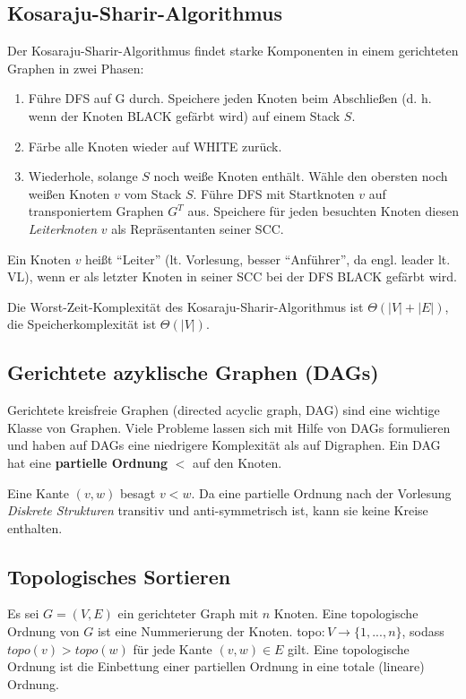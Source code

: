 \documentclass[12pt]{article}
\begin{document}
\subsection{Kosaraju-Sharir-Algorithmus}

Der Kosaraju-Sharir-Algorithmus findet starke Komponenten in einem gerichteten Graphen in zwei Phasen:

\begin{enumerate}
\item Führe DFS auf G durch. Speichere jeden Knoten beim Abschließen (d. h. wenn der Knoten BLACK gefärbt wird) auf einem Stack $S$.
\item Färbe alle Knoten wieder auf WHITE zurück.
\item Wiederhole, solange $S$ noch weiße Knoten enthält. Wähle den obersten noch weißen Knoten $v$ vom Stack $S$. Führe DFS mit Startknoten $v$ auf transponiertem Graphen $G^T$ aus. Speichere für jeden besuchten Knoten diesen \textit{Leiterknoten} $v$ als Repräsentanten seiner SCC.
\end{enumerate}

Ein Knoten $v$ heißt \enquote{Leiter} (lt. Vorlesung, besser \enquote{Anführer}, da engl. leader lt. VL), wenn er als letzter Knoten in seiner SCC bei der DFS BLACK gefärbt wird.

Die Worst-Zeit-Komplexität des Kosaraju-Sharir-Algorithmus ist $\Theta(|V| + |E|)$, die Speicherkomplexität ist $\Theta(|V|)$.

\subsection{Gerichtete azyklische Graphen (DAGs)}

Gerichtete kreisfreie Graphen (directed acyclic graph, DAG) sind eine wichtige Klasse von Graphen. Viele Probleme lassen sich mit Hilfe von DAGs formulieren und haben auf DAGs eine niedrigere Komplexität als auf Digraphen. Ein DAG hat eine \textbf{partielle Ordnung} $<$ auf den Knoten.

Eine Kante $(v, w)$ besagt $v < w$. Da eine partielle Ordnung nach der Vorlesung \textit{Diskrete Strukturen} transitiv und anti-symmetrisch ist, kann sie keine Kreise enthalten.

\subsection{Topologisches Sortieren}

Es sei $G = (V, E)$ ein gerichteter Graph mit $n$ Knoten. Eine topologische Ordnung von $G$ ist eine Nummerierung der Knoten. topo$: V \rightarrow \{1, ..., n\}$, sodass $topo(v) > topo(w)$ für jede Kante $(v, w) \in E$ gilt. Eine topologische Ordnung ist die Einbettung einer partiellen Ordnung in eine totale (lineare) Ordnung.
\end{document}
